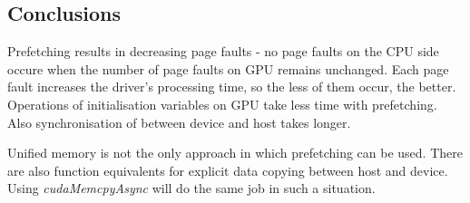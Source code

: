\documentclass[12pt]{article}
\begin{document}
\subsection{Conclusions}
Prefetching results in decreasing page faults - no page faults on the CPU side occure when the number of page faults on GPU remains unchanged. Each page fault increases the driver's processing time, so the less of them occur, the better.
Operations of initialisation variables on GPU take less time with prefetching. Also synchronisation of between device and host takes longer.

Unified memory is not the only approach in which prefetching can be used. There are also function equivalents for explicit data copying between host and device. Using \textit{cudaMemcpyAsync} will do the same job in such a situation.
\end{document}
